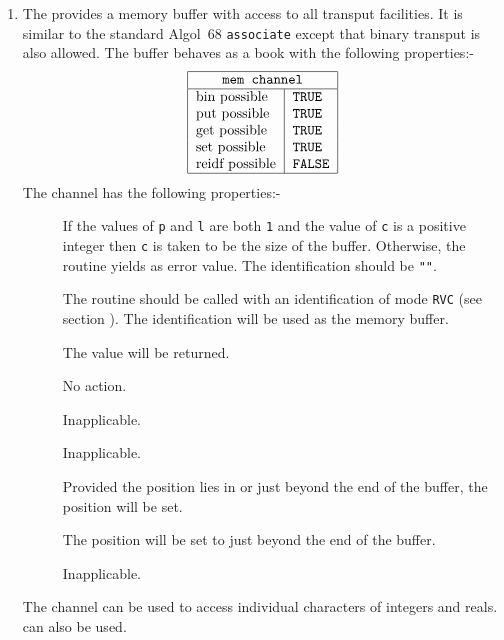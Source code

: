 \begin{enumerate}
\item {}\newline
The  provides a memory buffer with access to all transput
facilities. It is similar to the standard Algol~68 \verb|associate|
except that binary transput is also allowed. The buffer behaves as a
book with the following properties:-
$$\begin{tabular}{|l|l|}\hline
  \multicolumn{2}{|c|}{\texttt{mem channel}}\\ \hline
  bin possible & \texttt{TRUE} \\
  put possible & \texttt{TRUE} \\
  get possible & \texttt{TRUE} \\
  set possible & \texttt{TRUE} \\
  reidf possible & \texttt{FALSE}\\ \hline
  \end{tabular}
$$
The channel has the following properties:-
\begin{description}
\item[] If the values of \verb|p| and \verb|l| are both
\verb|1| and the value of \verb|c| is a positive integer then \verb|c|
is taken to be the size of the buffer. Otherwise, the routine yields
 as error value. The identification
should be \verb|""|.
\item[] The routine should be called with an identification of mode
\verb|RVC| (see section ). The identification will be
used as the memory buffer.
\item[] The value  will be
returned.
\item[] No action.
\item[] Inapplicable.
\item[] Inapplicable.
\item[] Provided the position lies in or just beyond the end of the
buffer, the position will be set.
\item[] The position will be set to just beyond the end of
the buffer.
\item[] Inapplicable.
\end{description}
The channel can be used to access individual characters of integers and
reals.  can also be used.


\end{enumerate}
